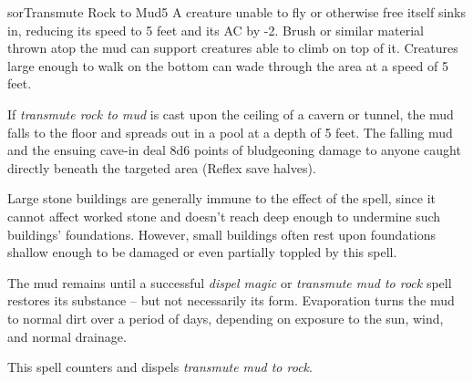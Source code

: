 \begin{spellcard}{sor}{Transmute Rock to Mud}{5}
  \medskip
  A creature unable to fly or otherwise free itself sinks in,
  reducing its speed to 5 feet and its AC by -2.
  Brush or similar material thrown atop the mud can
  support creatures able to climb on top of it. Creatures large enough to
  walk on the bottom can wade through the area at a speed of 5 feet.

  If \emph{transmute rock to mud} is cast upon the ceiling of a cavern or
  tunnel, the mud falls to the floor and spreads out in a pool at a depth
  of 5 feet. The falling mud and the ensuing cave-in deal 8d6 points of
  bludgeoning damage to anyone caught directly beneath the targeted area
  (Reflex save halves).

  Large stone buildings are generally immune to the effect of the spell,
  since it cannot affect worked stone and doesn't reach deep enough to
  undermine such buildings' foundations.
  However, small buildings often rest upon foundations shallow enough
  to be damaged or even partially toppled by this spell.

  The mud remains until a successful \emph{dispel magic} or
  \emph{transmute mud to rock} spell restores its substance -- but not
  necessarily its form.
  Evaporation turns the mud to normal dirt over a period of days,
  depending on exposure to the sun, wind, and normal drainage.

  \medskip
  This spell counters and dispels \emph{transmute mud to rock}.
\end{spellcard}
